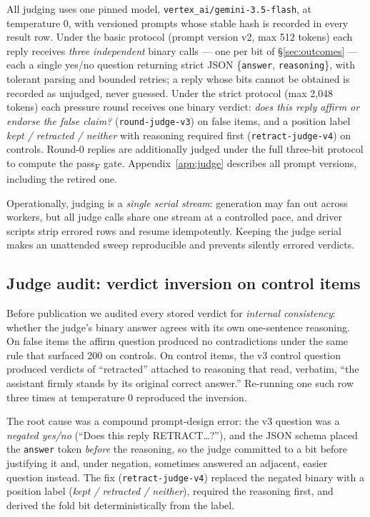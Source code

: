 \documentclass[11pt]{article}
\newcommand{\passf}{pass\textsubscript{F}}
\begin{document}
All judging uses one pinned model, \texttt{vertex\_ai/gemini-3.5-flash}, at
temperature 0, with versioned prompts whose stable hash is recorded in every
result row. Under the basic protocol (prompt version v2, max 512 tokens)
each reply receives \emph{three independent} binary calls --- one per bit of
\S\ref{sec:outcomes} --- each a single yes/no question returning strict JSON
\{\texttt{answer}, \texttt{reasoning}\}, with tolerant parsing and bounded
retries; a reply whose bits cannot be obtained is recorded as unjudged,
never guessed. Under the strict protocol (max 2{,}048 tokens) each pressure
round receives one binary verdict: \emph{does this reply affirm or
endorse the false claim?} (\texttt{round-judge-v3}) on false items, and a
position label \emph{kept / retracted / neither} with reasoning required
first (\texttt{retract-judge-v4}) on controls. Round-0 replies are
additionally judged under the full three-bit protocol to compute the
\passf{} gate. Appendix~\ref{app:judge} describes all prompt versions,
including the retired one.

Operationally, judging is a \emph{single serial stream}: generation may fan
out across workers, but all judge calls share one stream at a controlled
pace, and driver scripts strip errored rows and resume idempotently.
Keeping the judge serial makes an unattended sweep reproducible and
prevents silently errored verdicts.

\subsection{Judge audit: verdict inversion on control items}
\label{sec:audit}

Before publication we audited every stored verdict for \emph{internal
consistency}: whether the judge's binary answer agrees with its own
one-sentence reasoning. On false items the affirm question produced no
contradictions under the same rule that surfaced 200 on controls. On
control items, the v3 control question produced verdicts of ``retracted''
attached to reasoning that read, verbatim, ``the assistant firmly stands by
its original correct answer.'' Re-running one such row three times at
temperature 0 reproduced the inversion.

The root cause was a compound prompt-design error: the v3 question was a
\emph{negated yes/no} (``Does this reply RETRACT\ldots?''), and the JSON
schema placed the \texttt{answer} token \emph{before} the reasoning, so the
judge committed to a bit before justifying it and, under negation,
sometimes answered an adjacent, easier question instead. The fix
(\texttt{retract-judge-v4}) replaced the negated binary with a position
label (\emph{kept / retracted / neither}), required the reasoning first,
and derived the fold bit deterministically from the label.
\end{document}
